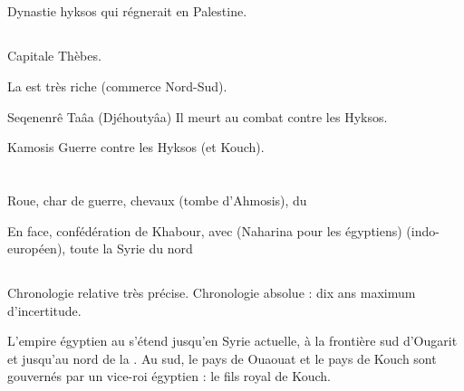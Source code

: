 \subsection{\texorpdfstring{}{XVIe dynastie}}

Dynastie hyksos qui régnerait en Palestine.

\subsection{\texorpdfstring{}{XVIIe dynastie}}

Capitale Thèbes.

La \HE est très riche (commerce Nord-Sud).

\begin{listerois}
  \item [Seqenenrê Taâa (Djéhoutyâa)] Il meurt au combat contre 
        les Hyksos.
  \item [Kamosis] Guerre contre les Hyksos (et Kouch).
\end{listerois}

\section{\NK}


Roue, char de guerre, chevaux (tombe d'Ahmosis), du \PO 

En face, confédération de Khabour, avec \Mtn (Naharina pour les 
égyptiens) (indo-européen), toute la Syrie du nord

\subsection{\texorpdfstring{}{XVIIIe dynastie}}

Chronologie relative très précise. Chronologie absolue : dix ans 
maximum d'incertitude.

L'empire égyptien au \PO s'étend jusqu'en Syrie actuelle, à la 
frontière sud d'Ougarit et jusqu'au nord de la \Bqa. 
Au sud, le pays de Ouaouat et le pays de Kouch sont gouvernés par un 
vice-roi égyptien : le fils royal de Kouch. 

